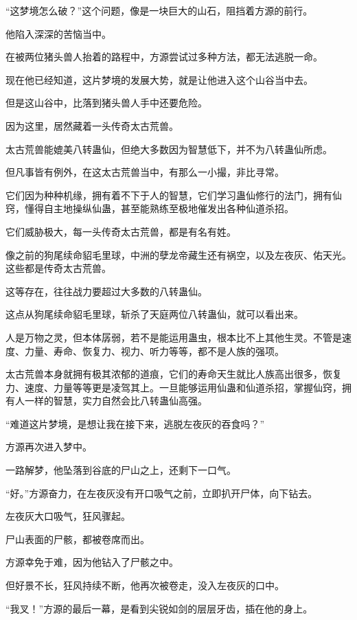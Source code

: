 \begin{this_body}
“这梦境怎么破？”这个问题，像是一块巨大的山石，阻挡着方源的前行。

他陷入深深的苦恼当中。

在被两位猪头兽人抬着的路程中，方源尝试过多种方法，都无法逃脱一命。

现在他已经知道，这片梦境的发展大势，就是让他进入这个山谷当中去。

但是这山谷中，比落到猪头兽人手中还要危险。

因为这里，居然藏着一头传奇太古荒兽。

太古荒兽能媲美八转蛊仙，但绝大多数因为智慧低下，并不为八转蛊仙所虑。

但凡事皆有例外，在这太古荒兽当中，有那么一小撮，非比寻常。

它们因为种种机缘，拥有着不下于人的智慧，它们学习蛊仙修行的法门，拥有仙窍，懂得自主地操纵仙蛊，甚至能熟练至极地催发出各种仙道杀招。

它们威胁极大，每一头传奇太古荒兽，都是有名有姓。

像之前的狗尾续命貂毛里球，中洲的孽龙帝藏生还有祸空，以及左夜灰、佑天光。这些都是传奇太古荒兽。

这等存在，往往战力要超过大多数的八转蛊仙。

这点从狗尾续命貂毛里球，斩杀了天庭两位八转蛊仙，就可以看出来。

人是万物之灵，但本体孱弱，若不是能运用蛊虫，根本比不上其他生灵。不管是速度、力量、寿命、恢复力、视力、听力等等，都不是人族的强项。

太古荒兽本身就拥有极其浓郁的道痕，它们的寿命天生就比人族高出很多，恢复力、速度、力量等等更是凌驾其上。一旦能够运用仙蛊和仙道杀招，掌握仙窍，拥有人一样的智慧，实力自然会比八转蛊仙高强。

“难道这片梦境，是想让我在接下来，逃脱左夜灰的吞食吗？”

方源再次进入梦中。

一路解梦，他坠落到谷底的尸山之上，还剩下一口气。

“好。”方源奋力，在左夜灰没有开口吸气之前，立即扒开尸体，向下钻去。

左夜灰大口吸气，狂风骤起。

尸山表面的尸骸，都被卷席而出。

方源幸免于难，因为他钻入了尸骸之中。

但好景不长，狂风持续不断，他再次被卷走，没入左夜灰的口中。

“我叉！”方源的最后一幕，是看到尖锐如剑的层层牙齿，插在他的身上。


\end{this_body}
